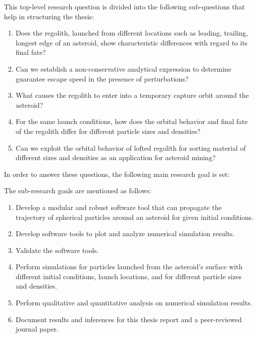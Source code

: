 \vspace{5mm}
This top-level research question is divided into the following sub-questions that help in structuring the thesis:
\begin{enumerate}
\item Does the regolith, launched from different locations such as leading, trailing, longest edge of an asteroid, show characteristic differences with regard to its final fate?
\item Can we establish a non-conservative analytical expression to determine guarantee escape speed in the presence of perturbations?
\item What causes the regolith to enter into a temporary capture orbit around the asteroid?
\item For the same launch conditions, how does the orbital behavior and final fate of the regolith differ for different particle sizes and densities?
\item Can we exploit the orbital behavior of lofted regolith for sorting material of different sizes and densities as an application for asteroid mining?
\end{enumerate}
\vspace{5mm}
In order to answer these questions, the following main research goal is set:
\begin{center}
\end{center}
The sub-research goals are mentioned as follows:
\begin{enumerate}
\item Develop a modular and robust software tool that can propagate the trajectory of spherical particles around an asteroid for given initial conditions.
\item Develop software tools to plot and analyze numerical simulation results.
\item Validate the software tools.
\item Perform simulations for particles launched from the asteroid's surface with different initial conditions, launch locations, and for different particle sizes and densities.
\item Perform qualitative and quantitative analysis on numerical simulation results.
\item Document results and inferences for this thesis report and a peer-reviewed journal paper.
\end{enumerate}
